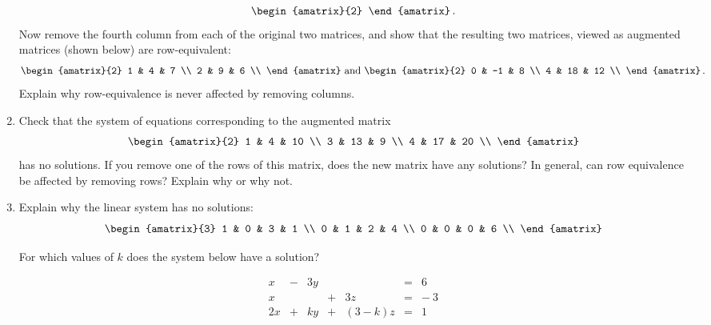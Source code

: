 \begin{enumerate}
\[\begin{amatrix}{2}
\end{amatrix}\, .
\]
Now remove the fourth column from each of the original two matrices, and show that the resulting two matrices, viewed as augmented matrices (shown below) are row-equivalent:
\[
\begin{amatrix}{2}
1 & 4 & 7 \\
2 & 9 & 6 \\
\end{amatrix}
\mbox{ and }
\begin{amatrix}{2}
0 & -1 & 8 \\
4 & 18 & 12 \\
\end{amatrix}\, .
\]
Explain why row-equivalence is never affected by removing columns.


\item Check that the system of equations corresponding to the augmented matrix
\[\begin{amatrix}{2}
1 & 4 & 10 \\
3 & 13 & 9 \\
4 & 17 & 20 \\
\end{amatrix}\]
has no solutions. If you remove one of the rows of this matrix, does the new matrix have any solutions? In general, can row equivalence be affected by removing rows? Explain why or why not.


\item \label{Ihavenoslons} 
Explain why the linear system has no solutions:
\[\begin{amatrix}{3}
1 & 0 & 3 & 1 \\
0 & 1 & 2 & 4 \\
0 & 0 & 0 & 6 \\
\end{amatrix}\]

For which values of $k$ does the system below have a solution?

    \begin{equation*}
      \begin{array}{rrrrrrr}
            x   &  -& 3y   & & &=  & 6  \\
            x   &  & &+& 3 z   &=  & -\ 3 \\
            2x  &  +& ky &  +&\!\! (3-k)z   &=  &1  
      \end{array}
    \end{equation*}


\end{enumerate}
